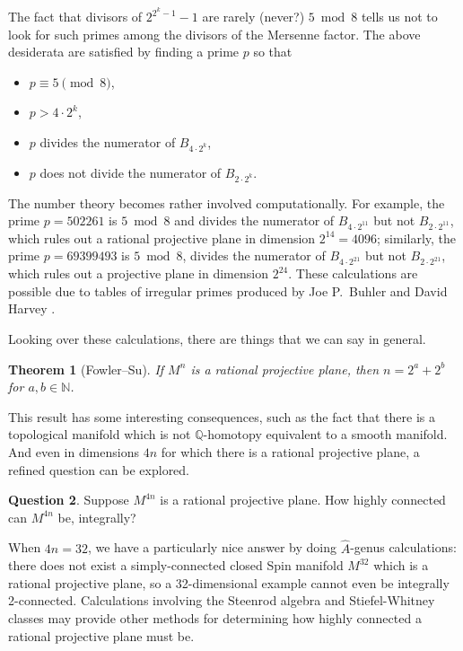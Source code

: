 \documentclass[12pt]{amsart}
\newtheorem{theorem}{Theorem}
\theoremstyle{definition}
\newtheorem{question}[theorem]{Question}
\newcommand{\Q}{\mathbb{Q}}
\begin{document}
The fact that divisors of $2^{2^k - 1} - 1$ are rarely (never?) $5
\bmod 8$ tells us not to look for such primes among the divisors of
the Mersenne factor.  The above desiderata are satisfied by finding a
prime $p$ so that
\begin{itemize}
\item $p \equiv 5 \pmod 8$,
\item $p > 4 \cdot 2^k$,
\item $p$ divides the numerator of $B_{4 \cdot 2^k}$,
\item $p$ does not divide the numerator of $B_{2 \cdot 2^k}$.
\end{itemize}
The number theory becomes rather involved computationally.  For
example, the prime $p = 502261$ is $5 \bmod 8$ and divides the
numerator of $B_{4 \cdot 2^{11}}$ but not $B_{2 \cdot 2^{11}}$, which
rules out a rational projective plane in dimension $2^{14} = 4096$;
similarly, the prime $p = 69399493$ is $5 \bmod 8$, divides the
numerator of $B_{4 \cdot 2^{21}}$ but not $B_{2 \cdot 2^{21}}$, which
rules out a projective plane in dimension $2^{24}$.  These
calculations are possible due to tables of irregular primes produced
by Joe P.~Buhler and David Harvey \cite{MR2813369}.

Looking over these calculations, there are things that we can say in
general.
\begin{theorem}[Fowler--Su]
  If $M^n$ is a rational projective plane, then $n = 2^a + 2^b$ for
  $a, b \in \mathbb{N}$.
\end{theorem}
This result has some interesting consequences, such as the fact that
there is a topological manifold which is not $\Q$-homotopy equivalent
to a smooth manifold.
And even in dimensions $4n$ for which there is a rational projective plane, a refined question can be explored.
\begin{question}
  Suppose $M^{4n}$ is a rational projective plane.  How highly
  connected can $M^{4n}$ be, integrally?
\end{question}
When $4n = 32$, we have a particularly nice answer by doing
$\hat{A}$-genus calculations: there does not exist a simply-connected
closed Spin manifold $M^{32}$ which is a rational projective plane, so
a 32-dimensional example cannot even be integrally 2-connected.
Calculations involving the Steenrod algebra and Stiefel-Whitney
classes may provide other methods for determining how highly connected
a rational projective plane must be.
\end{document}
